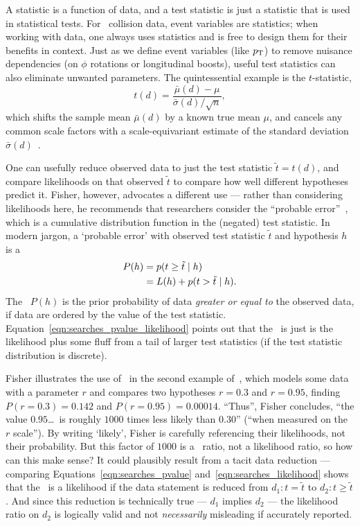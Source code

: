A statistic is a function of data, and a test statistic is just a statistic
that is used in statistical tests.
For \atlas\ collision data, event variables are statistics; when working with
data, one always uses statistics and is free to design them for their benefits
in context.
Just as we define event variables (like $p_\mathrm{T}$) to remove nuisance
dependencies (on $\phi$ rotations or longitudinal boosts),
useful test statistics can also eliminate unwanted parameters.
The quintessential example is the $t$-statistic,
\begin{equation}
\label{eqn:searches_t_statistic}
t(d) = \frac{\bar{\mu}(d) - \mu}{\bar{\sigma}(d)/\sqrt{n}}
,
\end{equation}
which shifts the sample mean $\bar{\mu}(d)$ by a known true mean $\mu$, and
cancels any common scale factors with a scale-equivariant estimate of the
standard deviation $\bar{\sigma}(d)$~\cite{
student1908,
fisher1925t,
lehmann2011fisher
}.

One can usefully reduce observed data to just the test statistic
$\tilde{t} = t(d)$, and compare likelihoods on that observed $\tilde{t}$
to compare how well different hypotheses predict it.
Fisher, however, advocates a different use ---
rather than considering likelihoods here, he recommends
that researchers consider the ``probable error''~\cite{fisher1921probable},
which is a cumulative distribution function in the (negated) test statistic.
In modern jargon, a `probable error' with observed test statistic
$\tilde{t}$ and hypothesis $h$ is a \textbf{\pvalue}
\begin{align}
P(h)
&= p(t \geq \tilde{t} \mid h)
\label{eqn:searches_pvalue}
\\
&= L(h) + p(t > \tilde{t} \mid h).
\label{eqn:searches_pvalue_likelihood}
\end{align}
The \pvalue\ $P(h)$ is the prior probability of data
\emph{greater or equal to} the observed data, if data are ordered by the value
of the test statistic.
Equation~\ref{eqn:searches_pvalue_likelihood} points out that the \pvalue\ is
just is the likelihood plus some fluff from a tail of larger test statistics
(if the test statistic distribution is discrete).

Fisher illustrates the use of \pvalues\ in the second example
of~\cite{fisher1921probable}, which models some data with a parameter $r$ and
compares two hypotheses
$r=0.3$ and
$r=0.95$, finding \pvalues\
$P(r=0.3)=0.142$ and
$P(r=0.95)=0.00014$.
``Thus'', Fisher concludes, ``the value $0.95$\ldots\ is roughly $1000$ times
less likely than $0.30$''
(``when measured on the $r$ scale'').
By writing `likely', Fisher is carefully referencing their likelihoods,
not their probability.
But this factor of $1000$ is a \pvalue\ ratio, not a likelihood ratio,
so how can this make sense?
It could plausibly result from a tacit data reduction --- comparing
Equations~\ref{eqn:searches_pvalue} and~\ref{eqn:searches_likelihood}
shows that the \pvalue\ is a likelihood if the data statement is reduced from
$d_1: t =    \tilde{t}$ to
$d_2: t \geq \tilde{t}$.
And since this reduction is technically true --- $d_1$ implies $d_2$ --- the
likelihood ratio on $d_2$ is logically valid and not \emph{necessarily}
misleading if accurately reported.

